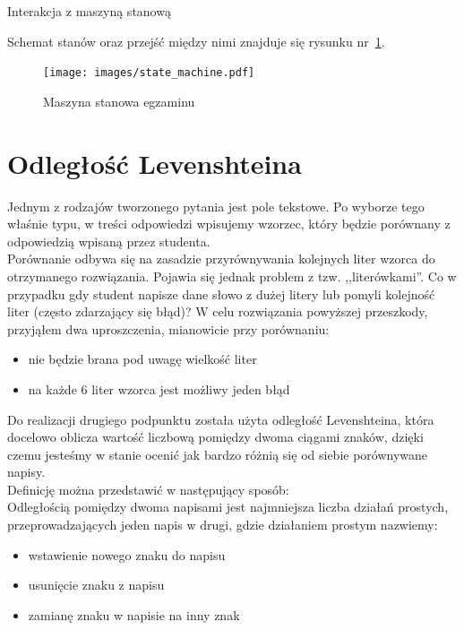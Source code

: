 \documentclass[12pt,twoside]{report}
\begin{document}
\begin{listing}
  
  \caption{Interakcja z maszyną stanową}
  \label{listing:state_machine_transitions}
\end{listing}


Schemat stanów oraz przejść między nimi znajduje się rysunku nr~\ref{fig:state_machine}.

\begin{figure}[ht]
  \begin{center}
    \texttt{[image: images/state\_machine.pdf]}
  \end{center}
  \caption{Maszyna stanowa egzaminu}
  \label{fig:state_machine}
\end{figure}


\section{Odległość Levenshteina}\label{sec:levenshtein}
Jednym z rodzajów tworzonego pytania jest pole tekstowe. Po wyborze tego właśnie typu, w
treści odpowiedzi wpisujemy wzorzec, który będzie porównany z odpowiedzią wpisaną przez
studenta.\\
Porównanie odbywa się na zasadzie przyrównywania kolejnych liter wzorca do otrzymanego
rozwiązania. Pojawia się jednak problem z tzw. ,,literówkami''. Co w przypadku gdy student
napisze dane słowo z dużej litery lub pomyli kolejność liter (często zdarzający się błąd)?
W celu rozwiązania powyższej przeszkody, przyjąłem dwa uproszczenia, mianowicie przy
porównaniu:
\begin{itemize}
  \item nie będzie brana pod uwagę wielkość liter
  \item na każde 6 liter wzorca jest możliwy jeden błąd
\end{itemize}


Do realizacji drugiego podpunktu została użyta odległość Levenshteina, która docelowo
oblicza wartość liczbową pomiędzy dwoma ciągami znaków, dzięki czemu jesteśmy w stanie
ocenić jak bardzo różnią się od siebie porównywane napisy.\\
Definicję można przedstawić w następujący sposób: \cite{levenshtein}\\
Odległością pomiędzy dwoma napisami jest najmniejsza liczba działań prostych,
przeprowadzających jeden napis w drugi, gdzie działaniem prostym nazwiemy:
\begin{itemize}
  \item wstawienie nowego znaku do napisu
  \item usunięcie znaku z napisu
  \item zamianę znaku w napisie na inny znak
\end{itemize}
\end{document}
